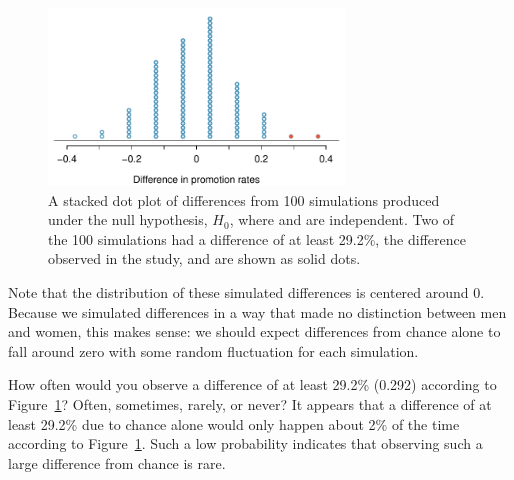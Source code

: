 \begin{figure}[ht]
\centering
\includegraphics[width=0.7\textwidth]{02/figures/discRandDotPlot/discRandDotPlot}
\caption{A stacked dot plot of differences from 100 simulations produced under the null hypothesis, $H_0$, where  and  are independent. Two of the 100 simulations had a difference of at least 29.2\%, the difference observed in the study, and are shown as solid dots.}
\label{discRandDotPlot}
\end{figure}

Note that the distribution of these simulated differences is centered around 0. Because we simulated differences in a way that made no distinction between men and women, this makes sense: we should expect differences from chance alone to fall around zero with some random fluctuation for each simulation.

\begin{example}{How often would you observe a difference of at least 29.2\% (0.292) according to Figure~\ref{discRandDotPlot}? Often, sometimes, rarely, or never?}
It appears that a difference of at least 29.2\% due to chance alone would only happen about 2\% of the time according to Figure~\ref{discRandDotPlot}. Such a low probability indicates that observing such a large difference from chance is rare.
\end{example}

